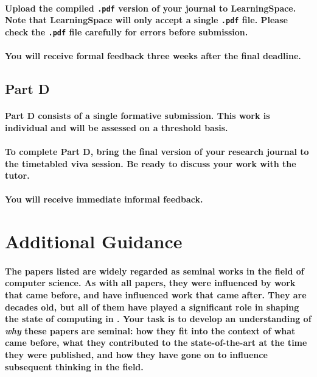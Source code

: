 \documentclass{../../fal_assignment}
\begin{document}
\paragraph{
Upload the compiled \texttt{.pdf} version of your journal to LearningSpace.
Note that LearningSpace will only accept a single \texttt{.pdf} file.
Please check the \texttt{.pdf} file carefully for errors before submission.
}

\paragraph{
You will receive \textbf{formal feedback} three weeks after the final deadline.
}

\subsection*{Part D}

\paragraph{
Part D consists of a \textbf{single formative submission}. This work is \textbf{individual} and will be assessed on a \textbf{threshold} basis.
}

\paragraph{
To complete Part D, bring the final version of your research journal to the timetabled viva session.
Be ready to discuss your work with the tutor.
}

\paragraph{You will receive \textbf{immediate informal feedback}.}

\section*{Additional Guidance}

\paragraph{
The papers listed are widely regarded as seminal works in the field of computer science.
As with all papers, they were influenced by work that came before,
and have influenced work that came after.
They are decades old, but all of them have played a significant role in shaping the state of computing
in \the\year.
Your task is to develop an understanding of \textit{why} these papers are seminal:
how they fit into the context of what came before,
what they contributed to the state-of-the-art at the time they were published,
and how they have gone on to influence subsequent thinking in the field.
}
\end{document}

